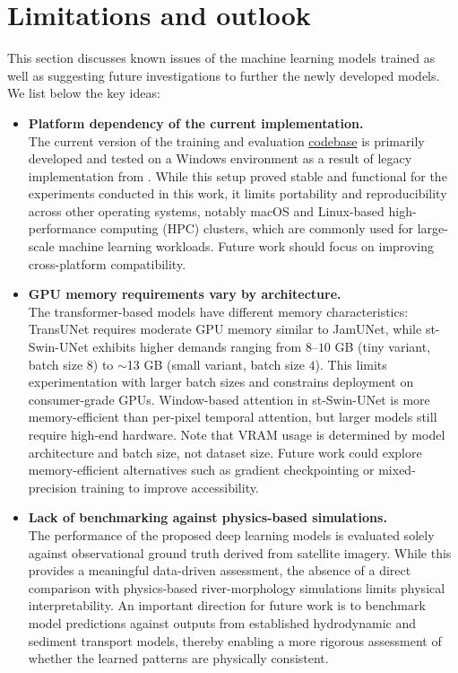\documentclass[10pt,oneside,a4paper,english]{article}
\begin{document}
\section{Limitations and outlook} \label{appendix: Limitations and outlook}
This section discusses known issues of the machine learning models trained as well as suggesting future investigations to further the newly developed models. We list below the key ideas:
\begin{itemize}
    \item \textbf{Platform dependency of the current implementation.} \\
    The current version of the training and evaluation \href{https://github.com/Romultra/River-Morpho-ML.git}{codebase} is primarily developed and tested on a Windows environment as a result of legacy implementation from \cite{magherini2024jamunet}. While this setup proved stable and functional for the experiments conducted in this work, it limits portability and reproducibility across other operating systems, notably macOS and Linux-based high-performance computing (HPC) clusters, which are commonly used for large-scale machine learning workloads. Future work should focus on improving cross-platform compatibility.
    \item \textbf{GPU memory requirements vary by architecture.} \\
    The transformer-based models have different memory characteristics: TransUNet requires moderate GPU memory similar to JamUNet, while st-Swin-UNet exhibits higher demands ranging from $8$--$10$ GB (tiny variant, batch size $8$) to $\sim$13 GB (small variant, batch size $4$). This limits experimentation with larger batch sizes and constrains deployment on consumer-grade GPUs. Window-based attention in st-Swin-UNet is more memory-efficient than per-pixel temporal attention, but larger models still require high-end hardware. Note that VRAM usage is determined by model architecture and batch size, not dataset size. Future work could explore memory-efficient alternatives such as gradient checkpointing or mixed-precision training to improve accessibility.
    \item \textbf{Lack of benchmarking against physics-based simulations.} \\
    The performance of the proposed deep learning models is evaluated solely against observational ground truth derived from satellite imagery. While this provides a meaningful data-driven assessment, the absence of a direct comparison with physics-based river-morphology simulations limits physical interpretability. An important direction for future work is to benchmark model predictions against outputs from established hydrodynamic and sediment transport models, thereby enabling a more rigorous assessment of whether the learned patterns are physically consistent.

\end{itemize}
\end{document}
